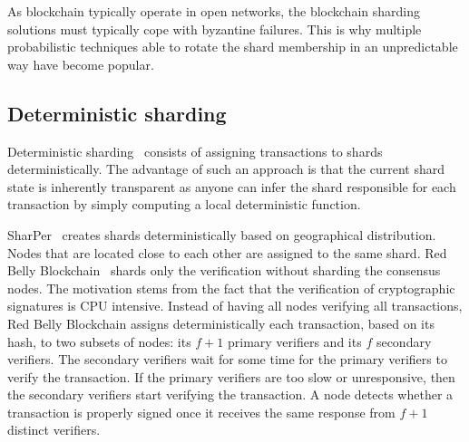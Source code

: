 \documentclass[11pt,dvipdfm]{article}
\newcommand{\vincent}[1]{\emph{Vincent: #1}}%
\newcommand{\deepal}[1]{\emph{Deepal: #1}}%
\begin{document}
As blockchain typically operate in open networks, the blockchain sharding solutions must typically cope with byzantine failures. This is why multiple probabilistic techniques able to rotate the shard membership in an unpredictable way have become popular.


%

\subsection{Deterministic sharding}

Deterministic sharding~\cite{10.1145/3448016.3452807,CHEN2019101055,CNG21} consists of assigning transactions to shards deterministically. 
The advantage of such an approach is that the current shard state is inherently transparent as anyone can infer the shard responsible for each transaction by simply computing a local deterministic function. 

SharPer~\cite{10.1145/3448016.3452807} creates shards deterministically based on geographical distribution. Nodes that are located close to each other are assigned to the same shard. 
Red Belly Blockchain~\cite{CNG21} shards only the verification without sharding the consensus nodes. The motivation stems from the fact that 
the verification of cryptographic signatures is CPU intensive. Instead of having all nodes verifying all transactions, Red Belly Blockchain 
assigns deterministically each transaction, based on its hash, to two subsets of nodes: its $f+1$ primary verifiers and its $f$ secondary verifiers. 
The secondary verifiers wait for some time for the primary verifiers to verify the transaction. If the primary verifiers are too slow or unresponsive, then the secondary verifiers start verifying the transaction. A node detects whether a transaction is properly signed once it receives the same response from $f+1$ distinct verifiers.
\end{document}
